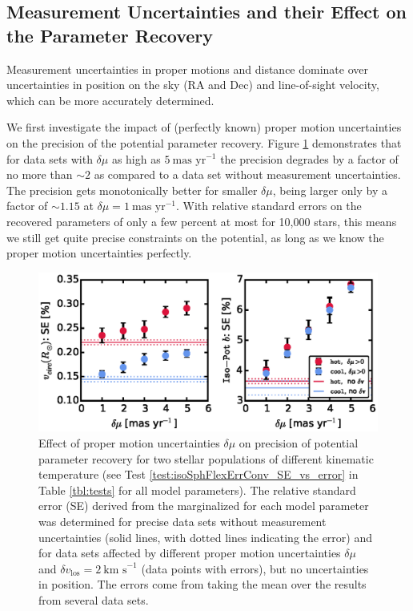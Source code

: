 \subsection{Measurement Uncertainties and their Effect on the Parameter Recovery} \label{sec:results_errors}

Measurement uncertainties in proper motions and distance dominate over uncertainties in position on the sky (RA and Dec) and line-of-sight velocity, which can be more accurately determined.

We first investigate the impact of (perfectly known) proper motion uncertainties on the precision of the potential parameter recovery. Figure \ref{fig:isoSphFlexErrConv_SE_vs_error} demonstrates that for data sets with $\delta \mu$ as high as $5~\text{mas yr}^{-1}$ the precision degrades by  a factor of no more than $\sim2$ as compared to a data set without measurement uncertainties. The precision gets monotonically better for smaller $\delta \mu$, being larger only by a factor of $\sim 1.15$ at $\delta \mu=1~\text{mas yr}^{-1}$. With relative standard errors on the recovered parameters of only a few percent at most for 10,000 stars, this means we still get quite precise constraints on the potential, as long as we know the proper motion uncertainties perfectly.


\begin{figure}[!htbp]
\centering
\includegraphics[width=\columnwidth]{figs/isoSphFlexErrConv_SE_vs_error.eps}
\caption{Effect of proper motion uncertainties $\delta \mu$ on precision of potential parameter recovery for two stellar populations of different kinematic temperature (see Test \ref{test:isoSphFlexErrConv_SE_vs_error} in Table \ref{tbl:tests} for all model parameters). The relative standard error (SE) derived from the marginalized \pdf{} for each model parameter was determined for precise data sets without measurement uncertainties (solid lines, with dotted lines indicating the error) and for data sets affected by different proper motion uncertainties $\delta \mu$ and $\delta v_\text{los}=2~\text{km s}^{-1}$ (data points with errors), but no uncertainties in position. The errors come from taking the mean over the results from several data sets.}
\label{fig:isoSphFlexErrConv_SE_vs_error}
\end{figure}


